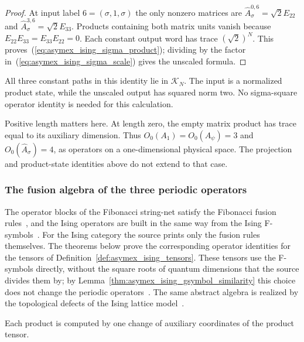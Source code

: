 \begin{proof}
    \leanok
    At input label $6=(\sigma,1,\sigma)$ the only nonzero matrices are
    $\widehat A_\sigma^{0,6}=\sqrt2E_{22}$ and
    $\widehat A_\sigma^{3,6}=\sqrt2E_{33}$.
    Products containing both matrix units vanish because
    $E_{22}E_{33}=E_{33}E_{22}=0$.
    Each constant output word has trace $(\sqrt2)^N$.
    This proves~(\ref{eq:asymex_ising_sigma_product});
    dividing by the factor in~(\ref{eq:asymex_ising_sigma_scale})
    gives the unscaled formula.
\end{proof}

All three constant paths in this identity lie in $\mathcal K_N$.
The input is a normalized product state, while the unscaled output
has squared norm two. No sigma-square operator identity is needed
for this calculation.

Positive length matters here. At length zero, the empty matrix
product has trace equal to its auxiliary dimension. Thus
$O_0(A_1)=O_0(A_\psi)=3$ and
$O_0(\widehat A_\sigma)=4$, as operators on a one-dimensional
physical space. The projection and product-state identities above
do not extend to that case.

\subsubsection{The fusion algebra of the three periodic operators}

The operator blocks of the Fibonacci string-net satisfy the Fibonacci
fusion rules~\cite[Appendix~D.1]{Bultinck2017Anyons}, and the Ising
operators are built in the same way from the Ising
F-symbols~\cite[Appendix~D.2]{Bultinck2017Anyons}. For the Ising category
the source prints only the fusion rules themselves. The theorems below
prove the corresponding operator identities for the tensors of
Definition~\ref{def:asymex_ising_tensors}. These tensors use the F-symbols
directly, without the square roots of quantum dimensions that the source
divides them by; by Lemma~\ref{thm:asymex_ising_gsymbol_similarity} this
choice does not change the periodic
operators~\cite{gap:bmwshv17_ising_boundary_tensor_normalization}. The
same abstract algebra is realized by the topological defects of the
Ising lattice model~\cite{Aasen2016Topological}.

Each product is computed by one change of auxiliary coordinates of the
product tensor.


